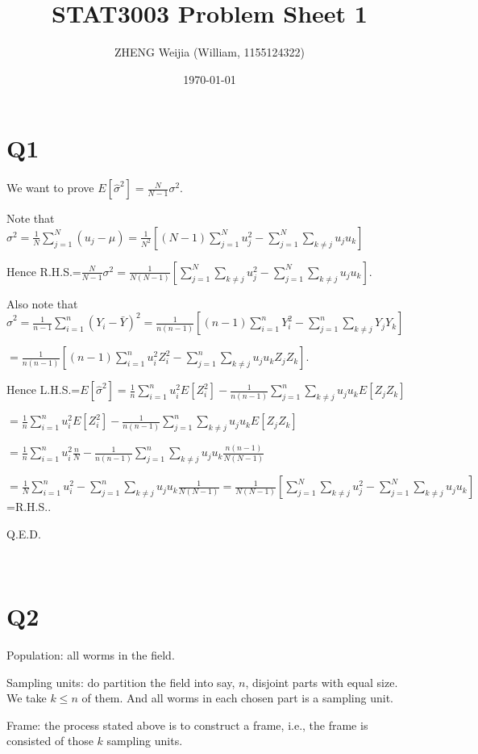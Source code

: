 \documentclass[12pt]{article}%
\begin{document}
\title{STAT3003 Problem Sheet 1}
\author{ZHENG Weijia (William, 1155124322)}
\date{\today}
\maketitle



\section{Q1}

We want to prove $E[\hat{\sigma}^2]=\frac{N}{N-1}\sigma^2.$

Note that $\sigma^2=\frac{1}{N}\sum_{j=1}^{N}(u_j-\mu)=\frac{1}{N^2}[(N-1)\sum_{j=1}^{N}u_j^2-\sum_{j=1}^{N}\sum_{k\neq j}u_ju_k]$

Hence R.H.S.=$\frac{N}{N-1}\sigma^2=\frac{1}{N(N-1)}[\sum_{j=1}^{N}\sum_{k\neq j}u_j^2-\sum_{j=1}^{N}\sum_{k\neq j}u_ju_k].$

Also note that $\hat{\sigma}^2=\frac{1}{n-1}\sum_{i=1}^{n}(Y_i-\bar{Y})^2=\frac{1}{n(n-1)}[(n-1)\sum_{i=1}^{n}Y_i^2-\sum_{j=1}^{n}\sum_{k\neq j}Y_jY_k]$

$=\frac{1}{n(n-1)}[(n-1)\sum_{i=1}^{n}u_i^2Z_i^2-\sum_{j=1}^{n}\sum_{k\neq j}u_ju_kZ_jZ_k].$

Hence L.H.S.=$E[\hat{\sigma}^2]=\frac{1}{n}\sum_{i=1}^{n}u_i^2E[Z_i^2]-\frac{1}{n(n-1)}\sum_{j=1}^{n}\sum_{k\neq j}u_ju_kE[Z_jZ_k]$

$=\frac{1}{n}\sum_{i=1}^{n}u_i^2E[Z_i^2]-\frac{1}{n(n-1)}\sum_{j=1}^{n}\sum_{k\neq j}u_ju_kE[Z_jZ_k]$

$=\frac{1}{n}\sum_{i=1}^{n}u_i^2\frac{n}{N}-\frac{1}{n(n-1)}\sum_{j=1}^{n}\sum_{k\neq j}u_ju_k\frac{n(n-1)}{N(N-1)}$

$=\frac{1}{N}\sum_{i=1}^{n}u_i^2-\sum_{j=1}^{n}\sum_{k\neq j}u_ju_k\frac{1}{N(N-1)}=\frac{1}{N(N-1)}[\sum_{j=1}^{N}\sum_{k\neq j}u_j^2-\sum_{j=1}^{N}\sum_{k\neq j}u_ju_k]$=R.H.S..

Q.E.D.

~\ 

\section{Q2}
Population: all worms in the field. 

Sampling units: do partition the field into say, $n$, disjoint parts with equal size. We take $k\leq n$ of them. And all worms in each chosen part is a sampling unit.

Frame: the process stated above is to construct a frame, i.e., the frame is consisted of those $k$ sampling units.
\end{document}
